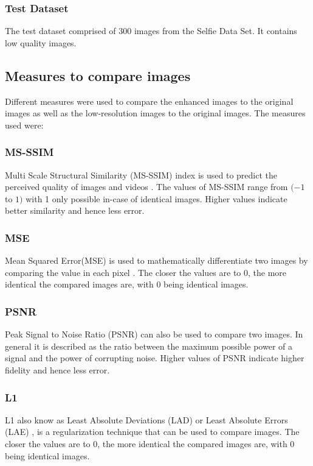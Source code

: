 \documentclass[conference]{IEEEtran}
\begin{document}
			\subsubsection{Test Dataset}
				The test dataset comprised of 300 images from the Selfie Data Set\cite{b9}. It contains low quality images.
				
		\subsection{Measures to compare images}
			Different measures were used to compare the enhanced images to the original images as well as the low-resolution images to the original images. The measures used were:
			
			\subsubsection{MS-SSIM}
				Multi Scale Structural Similarity (MS-SSIM) index is used to predict the perceived quality of images and videos \cite{b15}. The values of MS-SSIM range from $(-1$ to $1)$ with 1 only possible in-case of identical images. Higher values indicate better similarity and hence less error.
				
			\subsubsection{MSE}
				Mean Squared Error(MSE) is used to mathematically differentiate two images by comparing the value in each pixel \cite{b12}. The closer the values are to 0, the more identical the compared images are, with 0 being identical images.
				
			\subsubsection{PSNR} 
				Peak Signal to Noise Ratio (PSNR) can also be used to compare two images. In general it is described as the ratio between the maximum possible power of a signal and the power of corrupting noise\cite{b16}. Higher values of PSNR indicate higher fidelity and hence less error.
				
			\subsubsection{L1}
				L1 also know as Least Absolute Deviations (LAD) or Least Absolute Errors (LAE) \cite{b17, b18}, is a regularization technique that can be used to compare images. The closer the values are to 0, the more identical the compared images are, with 0 being identical images. 
				
\end{document}
